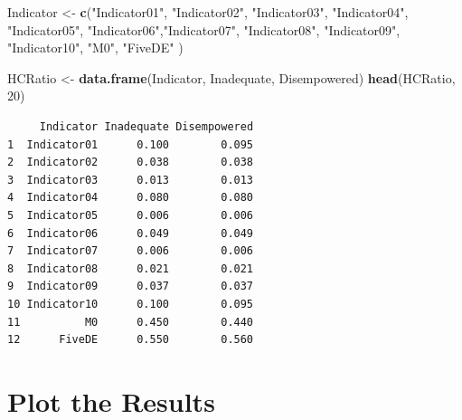 \documentclass[
]{book}
\newenvironment{Shaded}{\begin{snugshade}}{\end{snugshade}}
\newcommand{\DecValTok}[1]{\textcolor[rgb]{0.00,0.00,0.81}{#1}}
\newcommand{\KeywordTok}[1]{\textcolor[rgb]{0.13,0.29,0.53}{\textbf{#1}}}
\newcommand{\NormalTok}[1]{#1}
\newcommand{\StringTok}[1]{\textcolor[rgb]{0.31,0.60,0.02}{#1}}
\begin{document}
\begin{Shaded}
\begin{Highlighting}[]
\NormalTok{Indicator \textless{}{-}}\StringTok{ }\KeywordTok{c}\NormalTok{(}\StringTok{"Indicator01"}\NormalTok{, }\StringTok{"Indicator02"}\NormalTok{, }\StringTok{"Indicator03"}\NormalTok{, }\StringTok{"Indicator04"}\NormalTok{, }\StringTok{"Indicator05"}\NormalTok{, }\StringTok{"Indicator06"}\NormalTok{,}\StringTok{"Indicator07"}\NormalTok{, }\StringTok{"Indicator08"}\NormalTok{, }\StringTok{"Indicator09"}\NormalTok{, }\StringTok{"Indicator10"}\NormalTok{, }\StringTok{"M0"}\NormalTok{, }\StringTok{"FiveDE"}\NormalTok{ )}

\NormalTok{HCRatio \textless{}{-}}\StringTok{ }\KeywordTok{data.frame}\NormalTok{(Indicator, Inadequate, Disempowered)}
\KeywordTok{head}\NormalTok{(HCRatio, }\DecValTok{20}\NormalTok{)}
\end{Highlighting}
\end{Shaded}

\begin{verbatim}
     Indicator Inadequate Disempowered
1  Indicator01      0.100        0.095
2  Indicator02      0.038        0.038
3  Indicator03      0.013        0.013
4  Indicator04      0.080        0.080
5  Indicator05      0.006        0.006
6  Indicator06      0.049        0.049
7  Indicator07      0.006        0.006
8  Indicator08      0.021        0.021
9  Indicator09      0.037        0.037
10 Indicator10      0.100        0.095
11          M0      0.450        0.440
12      FiveDE      0.550        0.560
\end{verbatim}

\hypertarget{plot-the-results}{%
\section{Plot the Results}\label{plot-the-results}}
\end{document}
